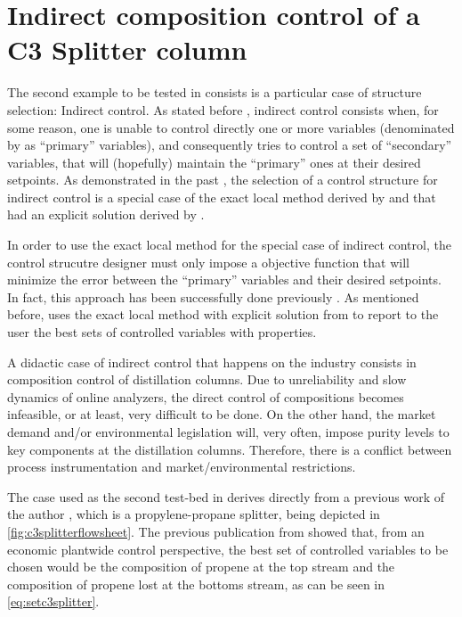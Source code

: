 \documentclass[../../msc-thesis.tex]{subfiles}
\begin{document}
\section{Indirect composition control of a C3 Splitter column}

The second example to be tested in \mtc consists is a particular case of \soc 
structure selection: Indirect control. As stated before \cite{Hori2005}, 
indirect control consists when, for some reason, one is unable to control 
directly one or more variables (denominated by \textcite{Hori2005} as 
``primary'' variables), and consequently tries to control a set of 
``secondary'' variables, that will (hopefully) maintain the ``primary'' ones 
at their desired setpoints. As demonstrated in the past 
\cite{Hori2005,Alstad2009}, the selection of a control structure for 
indirect control is a special case of the exact local method derived by 
\textcite{Halvorsen2003} and that had an explicit solution derived by 
\textcite{Alstad2009}. 

In order to use the exact local method for the special case of indirect 
control, the control strucutre designer must only impose a objective 
function that will minimize the error between the ``primary'' variables and 
their desired setpoints. In fact, this approach has been successfully done 
previously \cite{Hori2008}. As mentioned before, \mtc uses the exact local 
method with explicit solution from \textcite{Alstad2009} to report to the 
user the best sets of controlled variables with \soc properties. 

A didactic case of indirect control 
that happens on the industry consists in composition control of distillation 
columns. Due to unreliability and slow dynamics of online analyzers, the 
direct control of compositions becomes infeasible, or at least, very 
difficult to be done. On the other hand, the market demand and/or 
environmental legislation will, very often, impose purity levels to key 
components at the distillation columns. Therefore, there is a conflict 
between process instrumentation and market/environmental restrictions. 

The case used as the second test-bed in \mtc derives directly from a 
previous work of the author \cite{Alves2018}, which is a propylene-propane 
splitter, being depicted in \autoref{fig:c3splitterflowsheet}. The previous 
publication from \textcite{Alves2018} showed that, from an economic plantwide 
control perspective, the best set of controlled variables to be chosen 
would be the composition of propene at the top stream and the composition 
of propene lost at the bottoms stream, as can be seen in 
\autoref{eq:setc3splitter}.
\end{document}
